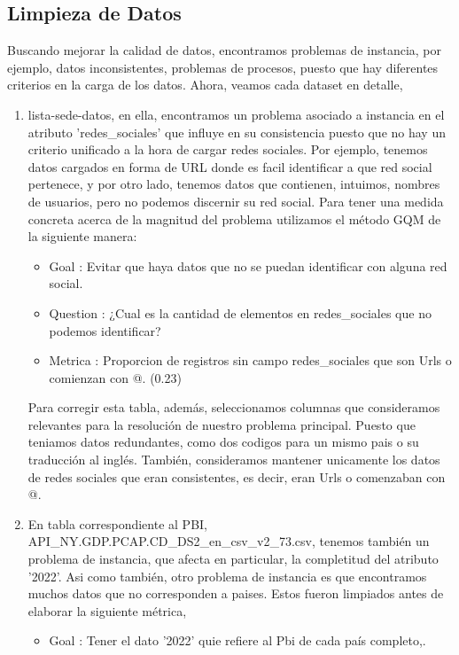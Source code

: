 \documentclass[10pt,a4paper]{article}
\begin{document}
\subsection{Limpieza de Datos}

Buscando mejorar la calidad de datos, encontramos problemas de instancia, por ejemplo, datos inconsistentes, problemas de 
procesos, puesto que hay diferentes criterios en la carga de los datos. Ahora, veamos cada dataset en detalle,

\begin{enumerate}
	\item lista-sede-datos, en ella, encontramos un problema asociado a instancia en el atributo 'redes\_sociales' que influye en su consistencia puesto que no hay un criterio unificado a la hora de cargar redes sociales. Por ejemplo, tenemos datos cargados en forma de URL donde es facil identificar a que red social pertenece, y por otro lado, tenemos datos que contienen, intuimos, nombres de usuarios, pero
no podemos discernir su red social. Para tener una medida concreta acerca de la magnitud del problema utilizamos el método GQM de la siguiente manera:
\begin{itemize}
	\item Goal : Evitar que haya datos que no se puedan identificar con alguna red social.
	\item Question : ¿Cual es la cantidad de elementos en redes\_sociales que no podemos identificar?
	\item Metrica :  Proporcion de registros sin campo redes\_sociales que son Urls o comienzan con @.  (0.23)
\end{itemize}
Para corregir esta tabla, además, seleccionamos columnas que consideramos relevantes para la resolución de nuestro problema principal. Puesto que teniamos datos redundantes, como dos codigos para un mismo pais o su traducción al inglés. También, consideramos mantener unicamente los datos de redes sociales que eran consistentes, es decir, eran Urls o comenzaban con @.
	\item En tabla correspondiente al PBI, API\_NY.GDP.PCAP.CD\_DS2\_en\_csv\_v2\_73.csv, tenemos también un problema de instancia, que afecta en particular, la completitud del atributo '2022'. Asi como también, otro problema de instancia es que encontramos muchos datos que no corresponden a paises. Estos fueron limpiados antes de elaborar la siguiente métrica,
\begin{itemize}
	\item Goal : Tener el dato '2022' quie refiere al Pbi de cada país completo,.

\end{itemize}
\end{enumerate}
\end{document}
